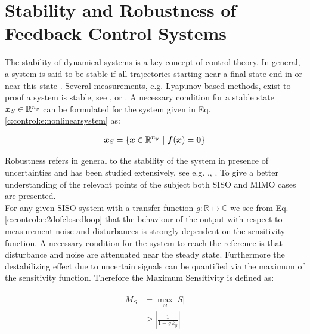 \section{Stability and Robustness of Feedback Control Systems}
\label{c:control:s:robustness}

The stability of dynamical systems is a key concept of control theory. In general, a system is said to be stable if all trajectories starting near a final state end in or near this state \cite[p.10]{Adamy2014}. Several measurements, e.g. Lyapunov based methods, exist to proof a system is stable, see \cite{Lunze2016},\cite{Lunze2014} or \cite{Adamy2014}. A necessary condition for a stable state $\mbox{\boldmath$x$}_S \in \mathbb{R}^{n_y}$ can be formulated for the system given in Eq. \ref{c:control:e:nonlinearsystem} as:

\begin{align}
\begin{split}
\mbox{\boldmath$x$}_S = \lbrace \mbox{\boldmath$x$} \in \mathbb{R}^{n_y} ~ | ~\mbox{\boldmath$f$}(\mbox{\boldmath$x$}) = \mbox{\boldmath$0$} \rbrace 
\end{split}
\label{c:control:e:StabilityCondition}
\end{align} 

Robustness refers in general to the stability of the system in presence of uncertainties and has been studied extensively, see e.g. \cite{Zhou1998},\cite{Zhou1996}, \cite{Doyle}.
To give a better understanding of the relevant points of the subject both SISO and MIMO cases are presented. \\

For any given SISO system with a transfer function $g : \mathbb{R} \mapsto \mathbb{C}$ we see from Eq. \ref{c:control:e:2dofclosedloop} that the behaviour of the output with respect to measurement noise and disturbances is strongly dependent on the sensitivity function. A necessary condition for the system to reach the reference is that disturbance and noise are attenuated  near the steady state. Furthermore the destabilizing effect due to uncertain signals can be quantified via the maximum of the sensitivity function. Therefore the Maximum Sensitivity is defined as:

\begin{align}
\begin{split}
M_S & = \max_\omega \left| S \right| \\
& \geq \left| \frac{1}{1 - g~k_y}\right|
\end{split}
\label{c:control:e:maxsensitivity}
\end{align}

